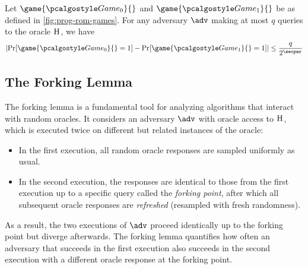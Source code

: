 \begin{proposition}\label{prop:prog-rom}
  Let $\game{\Game_0}{}$ and $\game{\Game_1}{}$ be as defined in \autoref{fig:prog-rom-games}.
  For any adversary $\adv$ making at most $q$ queries to the oracle ${\normalfont\textsc{H}}$, we have
  \[
  \left|\Pr[\game{\Game_0}{} = 1] - \Pr[\game{\Game_1}{} = 1]\right| \leq \frac{q}{2^\secpar}
  \]
\end{proposition}

\subsection{The Forking Lemma}

The forking lemma is a fundamental tool for analyzing algorithms that interact with random oracles. It considers an adversary $\adv$ with oracle access to ${\normalfont\textsc{H}}$, which is executed twice on different but related instances of the oracle:

\begin{itemize}
  \item In the first execution, all random oracle responses are sampled uniformly as usual.
  \item In the second execution, the responses are identical to those from the first execution up to a specific query called the \emph{forking point}, after which all subsequent oracle responses are \emph{refreshed} (resampled with fresh randomness).
\end{itemize}

As a result, the two executions of $\adv$ proceed identically up to the forking point but diverge afterwards. The forking lemma quantifies how often an adversary that succeeds in the first execution also succeeds in the second execution with a different oracle response at the forking point.

